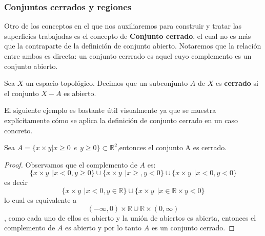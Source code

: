 \subsubsection{Conjuntos cerrados y regiones}

Otro de los conceptos en el que nos auxiliaremos para construir y tratar las superficies trabajadas es el concepto de \textbf{Conjunto cerrado}, el cual no es más que la contraparte de la definición de conjunto abierto. Notaremos que la relación entre ambos es directa: un conjunto cerrrado es aquel cuyo complemento es un conjunto abierto.


\begin{definition}
    Sea $X$ un espacio topológico. Decimos que un subconjunto $A$ de $X$ es \textbf{cerrado} si el conjunto $X-A$ es abierto.   
\end{definition}

El siguiente ejemplo es bastante útil visualmente ya que se muestra explícitamente cómo se aplica la definición de conjunto cerrado en un caso concreto.

\begin{example}
    Sea $A = \{x \times y | x\geq 0 \hspace{5pt} e \hspace{5pt} y \geq 0\} \subset \mathbb{R}^2$,entonces el conjunto A es cerrado.
    \begin{proof}
        Observamos que el complemento de $A$ es:
         \[\{x \times y \hspace{5pt}| x < 0 , y \geq 0\} \cup \{x \times y \hspace{5pt} | x \geq, y <0 \} \cup \{x \times y  \hspace{5pt}| x<0 , y <0 \}\] es decir \[\{x \times y \hspace{5pt}| x <0 , y \in \mathbb{R}\} \cup \{x \times y\hspace{5pt} | x \in \mathbb{R} \times y < 0\}\] lo cual es equivalente a  \[(- \infty , 0) \times \mathbb{R} \cup \mathbb{R} \times (0, \infty)\] , como cada uno de ellos es abierto y la unión de abiertos es abierta, entonces el complemento de $A$ es abierto y por lo tanto $A$ es un conjunto cerrado.
    \end{proof}

\end{example}

